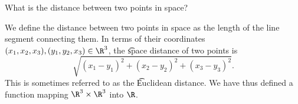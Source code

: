 

What is the distance between two points in space?


We define the distance between two points in space as the length of the line segment connecting them.
In terms of their coordinates $(x_1, x_2, x_3), (y_1, y_2, x_3) \in \R^3$, the \t{space distance} of two points is
\[
  \sqrt{(x_1 - y_1)^2 + (x_2 - y_2)^2 + (x_3 - y_3)^2}.
\]
This is sometimes referred to as the \t{Euclidean distance}.
We have thus defined a function mapping $\R^3 \times \R^3$ into $\R$.

\blankpage
